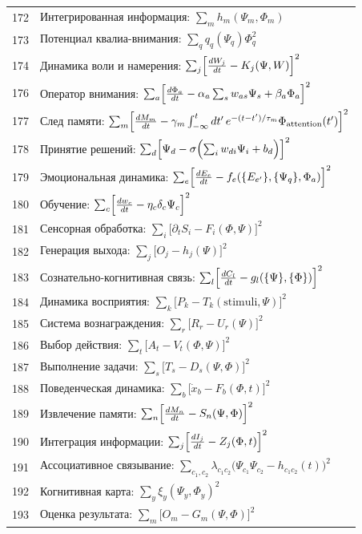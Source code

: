 \documentclass[12pt,a4paper]{article}
\begin{document}
\begin{longtable}{r l}
		172 & Интегрированная информация: $\sum_m h_m(\Psi_m,\Phi_m)$ \\
		173 & Потенциал квалиа-внимания: $\sum_q q_q(\Psi_q)\Phi_q^2$ \\
		174 & Динамика воли и намерения: $\sum_j\Bigl[\frac{dW_j}{dt} - K_j(\Psi,W)\Bigr]^2$ \\
		176 & Оператор внимания: $\sum_a\Bigl[\frac{d\Phi_a}{dt} - \alpha_a\sum_s w_{as}\Psi_s + \beta_a\Phi_a\Bigr]^2$ \\
		177 & След памяти: $\sum_m\Bigl[\frac{dM_m}{dt} - \gamma_m\int_{-\infty}^t dt'\,e^{-(t-t')/\tau_m}\Phi_{\text{attention}}(t')\Bigr]^2$ \\
		178 & Принятие решений: $\sum_d\Bigl[\Psi_d - \sigma\Bigl(\sum_i w_{di}\Psi_i + b_d\Bigr)\Bigr]^2$ \\
		179 & Эмоциональная динамика: $\sum_e\Bigl[\frac{dE_e}{dt} - f_e(\{E_{e'}\},\{\Psi_q\},\Phi_a)\Bigr]^2$ \\
		180 & Обучение: $\sum_c\Bigl[\frac{dw_c}{dt} - \eta_c\delta_c\Psi_c\Bigr]^2$ \\
		181 & Сенсорная обработка: $\sum_i\bigl[\partial_t S_i - F_i(\Phi,\Psi)\bigr]^2$ \\
		182 & Генерация выхода: $\sum_j\bigl[O_j - h_j(\Psi)\bigr]^2$ \\
		183 & Сознательно-когнитивная связь: $\sum_l\Bigl[\frac{dC_l}{dt} - g_l(\{\Psi\},\{\Phi\})\Bigr]^2$ \\
		184 & Динамика восприятия: $\sum_k\bigl[P_k - T_k(\text{stimuli},\Psi)\bigr]^2$ \\
		185 & Система вознаграждения: $\sum_r\bigl[R_r - U_r(\Psi)\bigr]^2$ \\
		186 & Выбор действия: $\sum_t\bigl[A_t - V_t(\Phi,\Psi)\bigr]^2$ \\
		187 & Выполнение задачи: $\sum_s\bigl[T_s - D_s(\Psi,\Phi)\bigr]^2$ \\
		188 & Поведенческая динамика: $\sum_b\bigl[\dot x_b - F_b(\Phi,t)\bigr]^2$ \\
		189 & Извлечение памяти: $\sum_n\Bigl[\frac{dM_n}{dt} - S_n(\Psi,\Phi)\Bigr]^2$ \\
		190 & Интеграция информации: $\sum_j\Bigl[\frac{dI_j}{dt} - Z_j(\Phi,t)\Bigr]^2$ \\
		191 & Ассоциативное связывание: $\sum_{c_1,c_2}\lambda_{c_1c_2}\bigl(\Psi_{c_1}\Psi_{c_2} - h_{c_1c_2}(t)\bigr)^2$ \\
		192 & Когнитивная карта: $\sum_y\xi_y(\Psi_y,\Phi_y)^2$ \\
		193 & Оценка результата: $\sum_m\bigl[O_m - G_m(\Psi,\Phi)\bigr]^2$ \\

\end{longtable}
\end{document}
